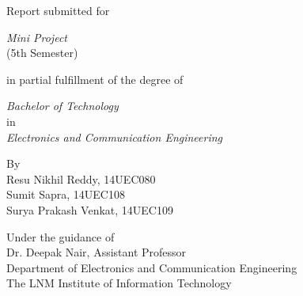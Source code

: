 \begin{titlepage}
\begin{tabular}{@{}p{\textwidth}@{}}
  \end{tabular}
      \vspace{1.1cm}
      \begin{center}
      	\Large{
      		Report submitted for
      	}
      	\end{center}
      	\vspace{0.3 cm}
      	\begin{center}
      	{
      		\LARGE \textit{Mini Project}\\
      		\large (5th Semester)
      	}
      \end{center}
        \vspace{0.4 cm}
      \begin{center}
      	{
      	\Large
      	 in partial fulfillment of the degree of
      	}
      	\end{center}
      	\vspace{0.3 cm}
      	\begin{center}
      		{\textsl{
      	\Large Bachelor of Technology} \\ \vspace{0.2 cm}
      	\large in \\ \vspace{0.2 cm}\textsl{
      	\Large Electronics and Communication Engineering}
      	}
      \end{center}
  \vspace{0.6 cm}
  \begin{center}
    {\large
      By
    }\\
    \vspace{0.2cm}
    {\Large
      Resu Nikhil Reddy, 14UEC080\\
      Sumit Sapra, 14UEC108\\
      Surya Prakash Venkat, 14UEC109
    }
\end{center}
  \vfill
 \begin{center}
 	{\large
      Under the guidance of\\
      Dr. Deepak Nair, Assistant Professor\\
      Department of Electronics and Communication Engineering\\
      The LNM Institute of Information Technology
    }
  \end{center}
  \begin{figure}
  	
  	\caption{}
  \end{figure}
\end{titlepage}
\clearpage
